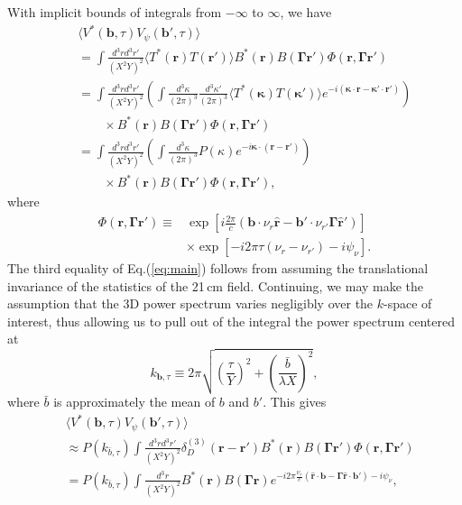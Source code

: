 \documentclass[twocolumn,apj,numberedappendix]{emulateapj}
\renewcommand\[{\begin{equation}}
\renewcommand\]{\end{equation}}
\begin{document}
With implicit bounds of integrals from $-\infty$ to $\infty$, we have
\begin{eqnarray}
 &&\langle V^{*}(\boldsymbol{b},\tau)V_{\psi}(\boldsymbol{b'},\tau)\rangle \nonumber \\
 && =\int \frac{d^{3}rd^{3}r'}{(X^2Y)^2}\langle T^{*}(\boldsymbol{r})T(\boldsymbol{r'})\rangle B^{*}(\boldsymbol{r})B(\boldsymbol{\Gamma} \boldsymbol{r'})\Phi(\boldsymbol{r},\boldsymbol{\Gamma} \boldsymbol{r'}) \nonumber \\
 &&  =\int \frac{d^{3}rd^{3}r'}{(X^2Y)^2}\left(\int\frac{d^{3}\kappa}{(2\pi)^{3}}\frac{d^{3}\kappa'}{(2\pi)^{3}}\langle T^{*}(\boldsymbol{\kappa})T(\boldsymbol{\kappa'})\rangle e^{-i(\boldsymbol{\kappa}\cdot \boldsymbol{r}-\boldsymbol{\kappa'}\cdot\boldsymbol{r'})}\right) \nonumber \\
 && \qquad  \times B^{*}(\boldsymbol{r})B(\boldsymbol{\Gamma} \boldsymbol{r'})\Phi(\boldsymbol{r},\boldsymbol{\Gamma} \boldsymbol{r'})\nonumber \\
 && =\int \frac{d^{3}rd^{3}r'}{(X^2Y)^2}\left(\int\frac{d^{3}\kappa}{(2\pi)^{3}}P(\kappa)e^{-i\boldsymbol{\kappa}\cdot(\boldsymbol{r}-\boldsymbol{r'})}\right) \nonumber \\
 && \qquad \times B^{*}(\boldsymbol{r})B(\boldsymbol{\Gamma} \boldsymbol{r'})\Phi(\boldsymbol{r},\boldsymbol{\Gamma} \boldsymbol{r'}),
 \end{eqnarray}
 where 
 \begin{eqnarray}
\Phi(\boldsymbol{r},\boldsymbol{\Gamma} \boldsymbol{r'})\equiv &\exp\left[i\frac{2\pi}{c}\left(\boldsymbol{b}\cdot\nu_{r}\hat{\boldsymbol{r}}-\boldsymbol{b'}\cdot\nu_{r'}\boldsymbol{\Gamma}\hat{\boldsymbol{r}}'\right)\right] \nonumber \\
& \times \exp\left[-i2\pi\tau\left(\nu_{r}-\nu_{r'}\right)-i\psi_{\nu}\right].
\end{eqnarray}
The third equality of Eq.(\ref{eq:main}) follows from assuming the translational invariance of the statistics of the 21\,cm field. Continuing, we may make the assumption that the 3D power spectrum varies negligibly over the $k$-space of interest, thus allowing us to pull out of the integral the power spectrum centered at 
\[
k_{\boldsymbol{b}, \tau} \equiv 2\pi \sqrt{\left(\frac{\tau}{Y}\right)^2 + \left(\frac{\bar{b}}{\lambda X}\right)^2},
\label{eq:kbtau}
\]
where $\bar{b}$ is approximately the mean of $b$ and $b'$. This gives 
 \begin{eqnarray}
  &&\langle V^{*}(\boldsymbol{b},\tau)V_{\psi}(\boldsymbol{b'},\tau)\rangle \nonumber \\
 && \approx P(k_{\bar{b}, \tau})\int \frac{d^{3}rd^{3}r'}{(X^2Y)^2} \delta_{D}^{(3)}(\boldsymbol{r}-\boldsymbol{r'})B^{*}(\boldsymbol{r})B(\boldsymbol{\Gamma} \boldsymbol{r'}) \Phi(\boldsymbol{r},\boldsymbol{\Gamma} \boldsymbol{r'}) \nonumber \\
 && = P(k_{\bar{b}, \tau})\!\!\int\!\! \frac{d^{3}r}{(X^2Y)^2}B^{*}(\boldsymbol{r})B(\boldsymbol{\Gamma} \boldsymbol{r}) e^{-i2\pi\frac{\nu_{r}}{c}\left(\hat{\boldsymbol{r}}\cdot\boldsymbol{b}-\boldsymbol{\Gamma} \hat{\boldsymbol{r}}\cdot\boldsymbol{b'}\right)-i\psi_{\nu}}, \qquad
\label{eq:main}
\end{eqnarray}
\end{document}
